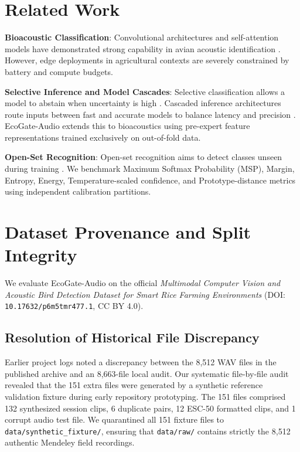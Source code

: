 \documentclass[11pt,a4paper]{article}
\begin{document}
\section{Related Work}
\textbf{Bioacoustic Classification}: Convolutional architectures and self-attention models have demonstrated strong capability in avian acoustic identification \cite{kahl2021birdnet,gong2021ast,koutini2022passt}. However, edge deployments in agricultural contexts are severely constrained by battery and compute budgets.

\textbf{Selective Inference and Model Cascades}: Selective classification allows a model to abstain when uncertainty is high \cite{geifman2017selective,cortes2016learning}. Cascaded inference architectures route inputs between fast and accurate models to balance latency and precision \cite{streeter2018approximation}. EcoGate-Audio extends this to bioacoustics using pre-expert feature representations trained exclusively on out-of-fold data.

\textbf{Open-Set Recognition}: Open-set recognition aims to detect classes unseen during training \cite{scheirer2013open,liu2020energy}. We benchmark Maximum Softmax Probability (MSP), Margin, Entropy, Energy, Temperature-scaled confidence, and Prototype-distance metrics using independent calibration partitions.

\section{Dataset Provenance and Split Integrity}
We evaluate EcoGate-Audio on the official \textit{Multimodal Computer Vision and Acoustic Bird Detection Dataset for Smart Rice Farming Environments} \cite{mendeley_smart_rice_birds_2026} (DOI: \texttt{10.17632/p6m5tmr477.1}, CC BY 4.0).

\subsection{Resolution of Historical File Discrepancy}
Earlier project logs noted a discrepancy between the 8,512 WAV files in the published archive and an 8,663-file local audit. Our systematic file-by-file audit revealed that the 151 extra files were generated by a synthetic reference validation fixture during early repository prototyping. The 151 files comprised 132 synthesized session clips, 6 duplicate pairs, 12 ESC-50 formatted clips, and 1 corrupt audio test file. We quarantined all 151 fixture files to \texttt{data/synthetic\_fixture/}, ensuring that \texttt{data/raw/} contains strictly the 8,512 authentic Mendeley field recordings.
\end{document}
